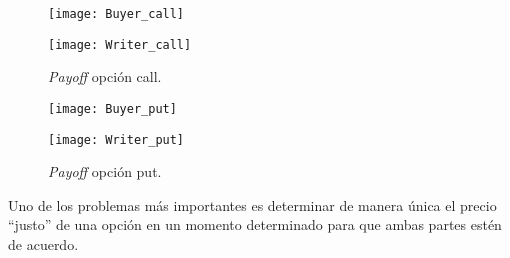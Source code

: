 \begin{figure}[h!]\label{graphCall}
	
	\begin{minipage}{0.5\textwidth}
		\centering
		\texttt{[image: Buyer\_call]} 
	\end{minipage}
	\begin{minipage}{0.5\textwidth}
		\texttt{[image: Writer\_call]}
		
	\end{minipage}
	
	\caption{\textit{Payoff} opción call.}
\end{figure}

\begin{figure}[h!]\label{graphPut}
	
	\begin{minipage}{0.5\textwidth}
		\centering
		\texttt{[image: Buyer\_put]} 
	\end{minipage}
	\begin{minipage}{0.5\textwidth}
		\texttt{[image: Writer\_put]}
		
	\end{minipage}
	
	\caption{\textit{Payoff} opción put.}
\end{figure} 
Uno de los problemas más importantes es determinar de manera única el precio ``justo'' de una opción en un momento determinado para que ambas partes estén de acuerdo.\\

